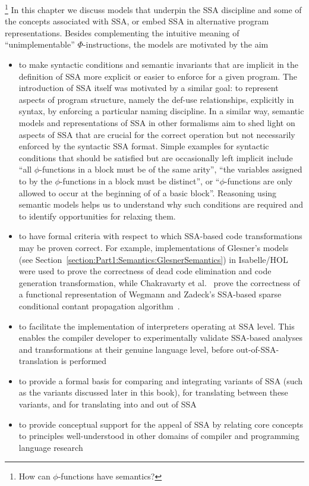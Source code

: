 \label{section:Part1:Semantics:Intro}
\footnote{How can $\phi$-functions have semantics?}  In this chapter
we discuss models that underpin the SSA discipline and some of the
concepts associated with SSA, or embed SSA in alternative program
representations. Besides complementing the intuitive meaning of
``unimplementable'' $\Phi$-instructions, the models are motivated by
the aim
\begin{itemize}
\item to make syntactic conditions and semantic invariants that are
  implicit in the definition of SSA more explicit or easier to enforce
  for a given program. The introduction of SSA itself was motivated by
  a similar goal: to represent aspects of program structure, namely
  the def-use relationships, explicitly in syntax, by enforcing a
  particular naming discipline. In a similar way, semantic models and
  representations of SSA in other formalisms aim to shed light on
  aspects of SSA that are crucial for the correct operation but not
  necessarily enforced by the syntactic SSA format. Simple examples
  for syntactic conditions that should be satisfied but are
  occasionally left implicit include ``all $\phi$-functions in a block
  must be of the same arity'', ``the variables assigned to by the
  $\phi$-functions in a block must be distinct'', or
  ``$\phi$-functions are only allowed to occur at the beginning of of
  a basic block''. Reasoning using semantic models helps us to
  understand why such conditions are required and to identify
  opportunities for relaxing them.
\item to have formal criteria with respect to which SSA-based code
  transformations may be proven correct. For example, implementations
  of Glesner's models (see
  Section~\ref{section:Part1:Semantics:GlesnerSemantics}) in
  Isabelle/HOL were used to prove the correctness of dead code
  elimination and code generation transformation, while Chakravarty et
  al.~\cite{ChakravartyKZ:COCV03} prove the correctness of a
  functional representation of Wegmann and Zadeck's SSA-based sparse
  conditional contant propagation
  algorithm~\cite{WegmannZ:Toplas1991}.
\item to facilitate the implementation of interpreters operating at
  SSA level. This enables the compiler developer to experimentally
  validate SSA-based analyses and transformations at their genuine
  language level, before out-of-SSA-translation is performed
\item to provide a formal basis for comparing and integrating variants
  of SSA (such as the variants discussed later in this book), for
  translating between these variants, and for translating into and
  out of SSA
\item to provide conceptual support for the appeal of SSA by relating
  core concepts to principles well-understood in other domains of
  compiler and programming language research
\end{itemize}
